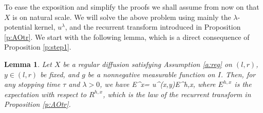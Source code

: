 \documentclass[11pt,reqno]{amsart}
\numberwithin{equation}{section}
\newtheorem{lemma}{Lemma}[section]
\begin{document}
To ease the exposition and simplify the proofs we shall assume from now on that  $X$ is on natural scale. We will solve the above problem   using mainly the $\lambda$-potential kernel, $u^{\lambda}$, and the recurrent transform introduced in Proposition \ref{p:AOtr}.  We start with the following lemma, which is a direct consequence of Proposition \ref{p:step1}.
\begin{lemma} \label{l:AO}
	Let $X$ be a regular diffusion satisfying Assumption \ref{a:reg} on $(l,r)$, $y \in (l,r)$ be fixed, and $g$ be a nonnegative measurable function on $I$.  Then, for any stopping time $\tau$ and $\lambda>0$, we have
	\be
	E^x=
	u^{\lambda}(x,y)E^{h,x},
	\ee
	where $E^{h,x}$ is the expectation with respect to $R^{h,x}$, which is the law of the recurrent transform in Proposition \ref{p:AOtr}.
\end{lemma} 
\end{document}
